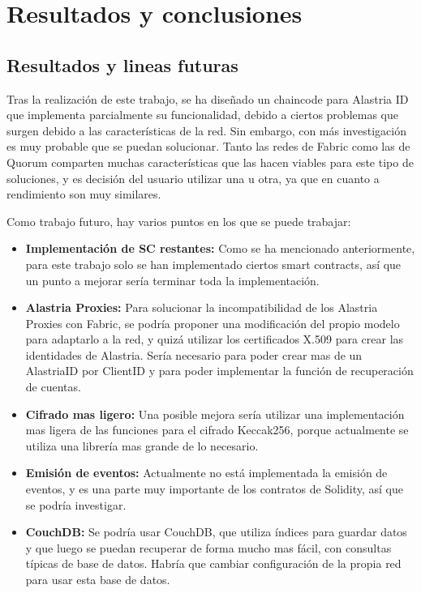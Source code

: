 \chapter{Resultados y conclusiones}
\section{Resultados y lineas futuras}
Tras la realización de este trabajo, se ha diseñado un chaincode para Alastria ID que implementa parcialmente su funcionalidad, debido a ciertos problemas que surgen debido a las características de la red. Sin embargo, con más investigación es muy probable que se puedan solucionar. Tanto las redes de Fabric como las de Quorum comparten muchas características que las hacen viables para este tipo de soluciones, y es decisión del usuario utilizar una u otra, ya que en cuanto a rendimiento son muy similares.

Como trabajo futuro, hay varios puntos en los que se puede trabajar:
\begin{itemize}
    \item \textbf{Implementación de SC restantes:} Como se ha mencionado anteriormente, para este trabajo solo se han implementado ciertos smart contracts, así que un punto a mejorar sería terminar toda la implementación.
    \item \textbf{Alastria Proxies:} Para solucionar la incompatibilidad de los Alastria Proxies con Fabric, se podría proponer una modificación del propio modelo para adaptarlo a la red, y quizá utilizar los certificados X.509 para crear las identidades de Alastria. Sería necesario para poder crear mas de un AlastriaID por ClientID y para poder implementar la función de recuperación de cuentas.
    \item \textbf{Cifrado mas ligero:} Una posible mejora sería utilizar una implementación mas ligera de las funciones para el cifrado Keccak256, porque actualmente se utiliza una librería mas grande de lo necesario.
    \item \textbf{Emisión de eventos:} Actualmente no está implementada la emisión de eventos, y es una parte muy importante de los contratos de Solidity, así que se podría investigar.
    \item \textbf{CouchDB:} Se podría usar CouchDB, que utiliza índices para guardar datos y que luego se puedan recuperar de forma mucho mas fácil, con consultas típicas de base de datos. Habría que cambiar configuración de la propia red para usar esta base de datos.
\end{itemize}
\clearpage
